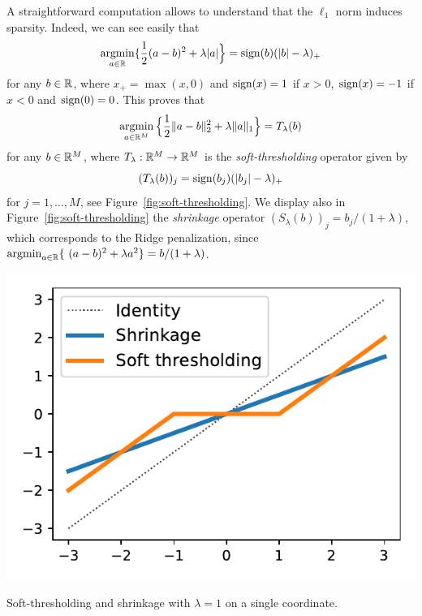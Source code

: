 A straightforward computation allows to understand that the $\ell_1$ norm induces sparsity.
Indeed, we can see easily that
\begin{equation}
	\label{eq:soft-thresholding1}
	\operatorname*{argmin}_{a \in \mathbb R} \{ \frac12 (a - b)^2 + \lambda |a| \Big\} 
	= \operatorname{sign}(b) (|b| - \lambda)_+
\end{equation}
for any $b \in \mathbb R$, where $x_+ = \max(x, 0)$ and $\operatorname{sign}(x) = 1$ if $x > 0$, $\operatorname{sign}(x) = -1$ if $x < 0$ and $\operatorname{sign}(0) = 0$.
This proves that
\begin{equation}
	\label{eq:soft-thresholding2}
	\operatorname*{argmin}_{a \in \mathbb R^M} \Big\{ \frac12 \| a - b \|_2^2 + \lambda \| a \|_1 \Big\}
	= T_\lambda(b)
\end{equation}
for any $b \in \mathbb R^M$, where $T_\lambda : \mathbb R^M \rightarrow \mathbb R^M$ is the \emph{soft-thresholding} operator given by 
\begin{equation*}
	(T_\lambda(b))_j = \operatorname{sign}(b_j) (|b_j| - \lambda)_+
\end{equation*}
for $j=1, \ldots, M$, see Figure~\ref{fig:soft-thresholding}.
We display also in Figure~\ref{fig:soft-thresholding} the \emph{shrinkage} operator $(S_\lambda(b))_j = b_j / (1 + \lambda)$, which corresponds to the Ridge penalization, since $\argmin_{a \in \R} \{ (a - b)^2 + \lambda a^2 \} = b / (1 + \lambda)$.
\begin{marginfigure}
	\includegraphics{assets/soft_thresholding.pdf}
	\caption{Soft-thresholding and shrinkage with $\lambda = 1$ on a single coordinate.}
	\label{fig:soft-thresholding}
\end{marginfigure}


